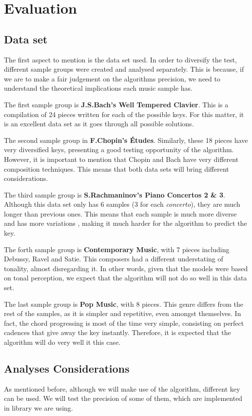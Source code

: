 \section{Evaluation} \label{sec:evaluation}

\subsection{Data set} \label{sec:data_set}
The first aspect to mention is the data set used.
In order to diversify the test, different sample groups were created and analysed separately.
This is because, if we are to make a fair judgement on the algorithms precision, we need to understand the theoretical implications each music sample has.

The first sample group is \textbf{J.S.Bach's Well Tempered Clavier}.
This is a compilation of 24 pieces written for each of the possible keys.
For this matter, it is an excellent data set as it goes through all possible solutions.

The second sample group in \textbf{F.Chopin's Études}.
Similarly, these 18 pieces have very diversified keys, presenting a good testing opportunity of the algorithm.
However, it is important to mention that Chopin and Bach have very different composition techniques.
This means that both data sets will bring different considerations.

The third sample group is \textbf{S.Rachmaninov's Piano Concertos 2 \& 3}.
Although this data set only has 6 samples (3 for each \textit{concerto}), they are much longer than previous ones.
This means that each sample is much more diverse and has more variations , making it much harder for the algorithm to predict the key.

The forth sample group is \textbf{Contemporary Music}, with 7 pieces including Debussy, Ravel and Satie.
This composers had a different understating of tonality, almost disregarding it.
In other words, given that the models were based on tonal perception, we expect that the algorithm will not do so well in this data set.

The last sample group is \textbf{Pop Music}, with 8 pieces.
This genre differs from the rest of the samples, as it is simpler and repetitive, even amongst themselves.
In fact, the chord progressing is most of the time very simple, consisting on perfect cadences that give away the key instantly.
Therefore, it is expected that the algorithm will do very well it this case.

\subsection{Analyses Considerations} \label{sec:analyses_considerations}
As mentioned before, although we will make use of the \citeauthor{krumhansl2001cognitive} algorithm, different key can be used.
We will test the precision of some of them, which are implemented in library we are using.

